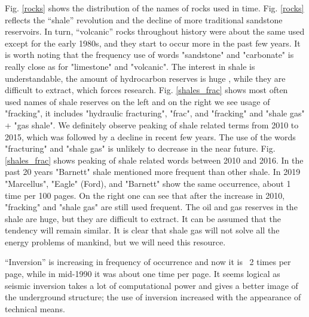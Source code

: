 \documentclass[geosciences,article,submit,moreauthors,pdftex]{Definitions/mdpi}
\begin{document}
Fig. \ref{rocks} shows the distribution of the names of rocks used in time. Fig. \ref{rocks} reflects the “shale” revolution and the decline of more traditional sandstone reservoirs. In turn, “volcanic” rocks throughout history were about the same used except for the early 1980s, and they start to occur more in the past few years. It is worth noting that the frequency use of words "sandstone" and "carbonate" is really close as for "limestone" and "volcanic". The interest in shale is understandable, the amount of hydrocarbon reserves is huge %
, while they are difficult to extract, which forces research. Fig. \ref{shales_frac} shows most often used names of shale reserves on the left and on the right we see usage of "fracking", it includes "hydraulic fracturing", "frac", and "fracking" and "shale gas" + "gas shale". We definitely observe peaking of shale related terms from 2010 to 2015, which was followed by a decline in recent few years. The use of the words "fracturing" and "shale gas" is unlikely to decrease in the near future. Fig. \ref{shales_frac} shows peaking of shale related words between 2010 and 2016. In the past 20 years "Barnett" shale mentioned more frequent than other shale. In 2019 "Marcellus", "Eagle" (Ford), and "Barnett" show the same occurrence, about 1 time per 100 pages. 
On the right one can see that after the increase in 2010, "fracking" and "shale gas" are still used frequent. The oil and gas reserves in the shale are huge,%
 but they are difficult to extract. It can be assumed that the tendency will remain similar. It is clear that shale gas will not solve all the energy problems of mankind, but we will need this resource.   

“Inversion” is increasing in frequency of occurrence and now it is ~2 times per page, while in mid-1990 it was about one time per page.  It seems logical as seismic inversion takes a lot of computational power and gives a better image of the underground structure; the use of inversion increased with the appearance of technical means. 
\end{document}
